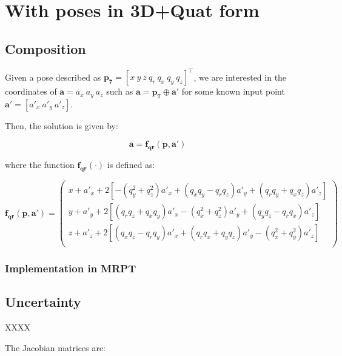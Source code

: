 \documentclass[a4paper,10pt]{report}
\begin{document}
\section{With poses in 3D+Quat form}

\subsection{Composition}

Given a pose described as $\mathbf{p_7} = [x ~ y ~ z ~  q_r ~ q_x ~ q_y ~ q_z ] ^ \top$, 
we are interested in the coordinates of $\mathbf{a}={a_x ~ a_y ~ a_z}$ such as
$\mathbf{a} = \mathbf{p_7} \oplus \mathbf{a'}$ for some known input point 
$\mathbf{a'} = [a'_x ~ a'_y ~ a'_z]$. 

Then, the solution is given by:

\begin{equation}
\mathbf{a} = \mathbf{f_{qr}} (\mathbf{p},\mathbf{a'})
\end{equation}

\noindent where the function $\mathbf{f_{qr}}(\cdot)$ is defined as:

\begin{equation}
\mathbf{f_{qr}} (\mathbf{p},\mathbf{a'}) = 
 \left(
\begin{array}{c}
 x + a'_x + 2 \left[-(q_y^2+ q_z^2) a'_x +(q_x q_y - q_r q_z) a'_y+(q_r q_y+q_x q_z) a'_z \right]  \\
 y + a'_y + 2 \left[(q_r q_z+  q_x q_y) a'_x-(q_x^2 +q_z^2) a'_y+(q_y q_z-q_r q_x) a'_z \right] \\
 z + a'_z + 2 \left[(q_x q_z-  q_r q_y) a'_x+(q_r q_x + q_y q_z) a'_y-(q_x^2+q_y^2) a'_z \right]  \\
\end{array}
\right)
\label{eq:quat_rot_point_func}
\end{equation}

\subsubsection{Implementation in MRPT}


\subsection{Uncertainty}

XXXX

The Jacobian matrices are:
\end{document}
